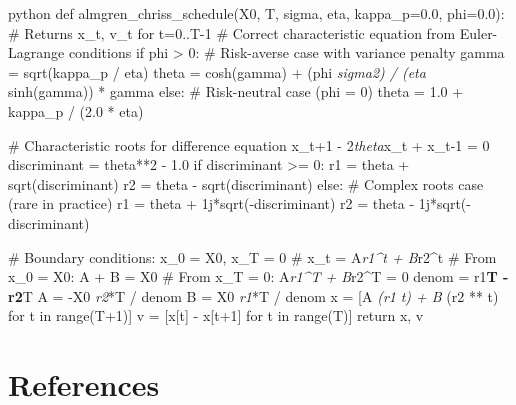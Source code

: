 \documentclass[11pt,a4paper]{article}
\begin{document}
python
def almgren\_chriss\_schedule(X0, T, sigma, eta, kappa\_p=0.0, phi=0.0):
    \# Returns x\_t, v\_t for t=0..T-1
    \# Correct characteristic equation from Euler-Lagrange conditions
    if phi > 0:
        \# Risk-averse case with variance penalty
        gamma = sqrt(kappa\_p / eta)  
        theta = cosh(gamma) + (phi \textit{ sigma}\textit{2) / (eta } sinh(gamma)) * gamma
    else:
        \# Risk-neutral case (phi = 0)
        theta = 1.0 + kappa\_p / (2.0 * eta)
    
    \# Characteristic roots for difference equation x\_{t+1} - 2\textit{theta}x\_t + x\_{t-1} = 0
    discriminant = theta**2 - 1.0
    if discriminant >= 0:
        r1 = theta + sqrt(discriminant) 
        r2 = theta - sqrt(discriminant)
    else:
        \# Complex roots case (rare in practice)
        r1 = theta + 1j*sqrt(-discriminant)
        r2 = theta - 1j*sqrt(-discriminant)
    
    \# Boundary conditions: x\_0 = X0, x\_T = 0
    \# x\_t = A\textit{r1^t + B}r2^t
    \# From x\_0 = X0: A + B = X0
    \# From x\_T = 0:  A\textit{r1^T + B}r2^T = 0
    denom = r1\textbf{T - r2}T
    A = -X0 \textit{ r2}*T / denom
    B = X0 \textit{ r1}*T / denom
    x = [A \textit{ (r1 }\textit{ t) + B } (r2 ** t) for t in range(T+1)]
    v = [x[t] - x[t+1] for t in range(T)]
    return x, v


\section{References}

\end{document}
